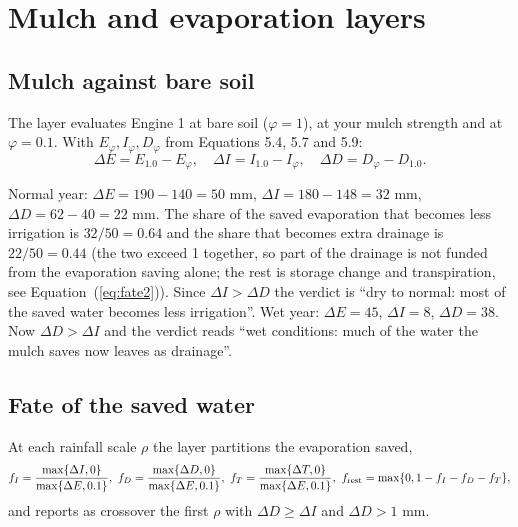 \chapter{Mulch and evaporation layers}\label{ch:mulch}

\section{Mulch against bare soil}
The layer evaluates Engine 1 at bare soil ($\varphi=1$), at your mulch strength and at $\varphi=0.1$. With $E_\varphi,I_\varphi,D_\varphi$ from Equations 5.4, 5.7 and 5.9:
\begin{equation}\boxed{\Delta E=E_{1.0}-E_\varphi,\quad\Delta I=I_{1.0}-I_\varphi,\quad\Delta D=D_\varphi-D_{1.0}.}\end{equation}

\sol  Normal year: $\Delta E=190-140=50$ mm, $\Delta I=180-148=32$ mm, $\Delta D=62-40=22$ mm. The share of the saved evaporation that becomes less irrigation is $32/50=0.64$ and the share that becomes extra drainage is $22/50=0.44$ (the two exceed 1 together, so part of the drainage is not funded from the evaporation saving alone; the rest is storage change and transpiration, see Equation~(\ref{eq:fate2})). Since $\Delta I>\Delta D$ the verdict is ``dry to normal: most of the saved water becomes less irrigation''. Wet year: $\Delta E=45$, $\Delta I=8$, $\Delta D=38$. Now $\Delta D>\Delta I$ and the verdict reads ``wet conditions: much of the water the mulch saves now leaves as drainage''.


\section{Fate of the saved water}
At each rainfall scale $\rho$ the layer partitions the evaporation saved,
\begin{equation}\label{eq:fate2}f_I=\frac{\max\{\Delta I,0\}}{\max\{\Delta E,0.1\}},\ f_D=\frac{\max\{\Delta D,0\}}{\max\{\Delta E,0.1\}},\ f_T=\frac{\max\{\Delta T,0\}}{\max\{\Delta E,0.1\}},\ f_{\rm rest}=\max\{0,1-f_I-f_D-f_T\},\end{equation}
and reports as crossover the first $\rho$ with $\Delta D\ge\Delta I$ and $\Delta D>1$ mm.

